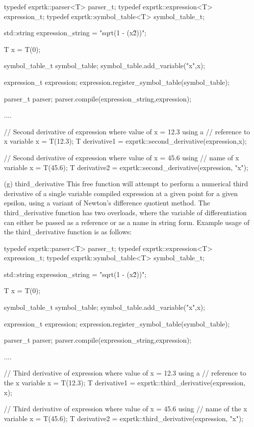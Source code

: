 {typedef exprtk::parser<T>             parser\_t;
typedef exprtk::expression<T>     expression\_t;
typedef exprtk::symbol\_table<T> symbol\_table\_t;

std::string expression\_string = "sqrt(1 - (x\^2))";

T x = T(0);

symbol\_table\_t symbol\_table;
symbol\_table.add\_variable("x",x);

expression\_t expression;
expression.register\_symbol\_table(symbol\_table);

parser\_t parser;
parser.compile(expression\_string,expression);

....

// Second derivative of expression where value of x = 12.3 using a
// reference to x variable
x = T(12.3);
T derivative1 = exprtk::second\_derivative(expression,x);

// Second derivative of expression where value of x = 45.6 using
// name of x variable
x = T(45.6);
T derivative2 = exprtk::second\_derivative(expression, "x");


(g) third\_derivative
This  free  function  will  attempt  to  perform  a  numerical   third
derivative of a single variable  compiled expression at a given  point
for a given epsilon, using  a variant of Newton's difference  quotient
method. The  third\_derivative function  has two  overloads, where  the
variable of differentiation can either be passed as a reference or  as
a name in string form. Example  usage of the third\_derivative function
is as follows:

typedef exprtk::parser<T>             parser\_t;
typedef exprtk::expression<T>     expression\_t;
typedef exprtk::symbol\_table<T> symbol\_table\_t;

std::string expression\_string = "sqrt(1 - (x\^2))";

T x = T(0);

symbol\_table\_t symbol\_table;
symbol\_table.add\_variable("x",x);

expression\_t expression;
expression.register\_symbol\_table(symbol\_table);

parser\_t parser;
parser.compile(expression\_string,expression);

....

// Third derivative of expression where value of x = 12.3 using a
// reference to the x variable
x = T(12.3);
T derivative1 = exprtk::third\_derivative(expression, x);

// Third derivative of expression where value of x = 45.6 using
// name of the x variable
x = T(45.6);
T derivative2 = exprtk::third\_derivative(expression, "x");

}
